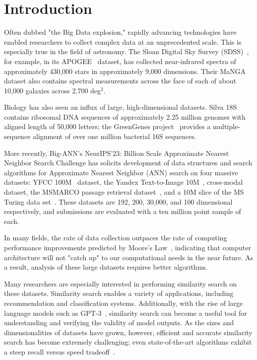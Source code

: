 \section{Introduction}
\label{sec:introduction}
Often dubbed "the Big Data explosion," rapidly advancing technologies have enabled researchers to collect complex data at an unprecedented scale. 
This is especially true in the field of astronomy. 
The Sloan Digital Sky Survey (SDSS)~\cite{blanton2017sdss}, for example, in its APOGEE~\cite{alam2015eleventh} dataset, has collected near-infrared spectra of approximately 430,000 stars in approximately 9,000 dimensions. 
Their MaNGA dataset also contains spectral measurements across the face of each of about 10,000 galaxies across 2,700 deg$^2$. 

Biology has also seen an influx of large, high-dimensional datasets. Silva 18S~\cite{10.1093/nar/gks1219} contains ribosomal DNA sequences of approximately 2.25 
million genomes with aligned length of 50,000 letters; 
the GreenGenes project~\cite{desantis2006greengenes} provides a multiple-sequence alignment of over one million bacterial 16S sequences.


More recently, Big-ANN's NeurIPS'23: Billion Scale Approximate Nearest Neighbor Search Challenge has 
solicits development of data structures and search algorithms for Approximate Nearest Neighbor (ANN) search
on four massive datasets: YFCC 100M~\cite{johnson2019billion} dataset, the Yandex Text-to-Image 10M~\cite{diskann-github}, cross-modal dataset, 
the MSMARCO passage retrieval dataset~\cite{Bruch2023AnAA}, and a 10M slice of the MS Turing data set~\cite{Singh2021FreshDiskANNAF}. These datasets 
are 192, 200, 30,000, and 100 dimensional respectively, and submissions are evaluated with 
a ten million point sample of each. 


In many fields, the rate of data collection outpaces the rate of computing performance improvements predicted by Moore's Law~\cite{brescia2012extracting}, indicating 
that computer architecture will not "catch up" to our computational needs in the near future. As a result, analysis of these large datasets 
requires better algorithms. 

Many researchers are especially interested in performing similarity search on these datasets. 
Similarity search enables a variety of applications, including recommendation and classification systems. 
Additionally, with the rise of large language models such as GPT-3~\cite{2020arXiv200514165B}, similarity search can become a useful tool for 
understanding and verifying the validity of model outputs. 
As the sizes and dimensionalities of datasets have grown, however, efficient and accurate similarity search has become extremely challenging; 
even state-of-the-art algorithms exhibit a steep recall versus speed tradeoff~\cite{ishaq2019clustered}.


